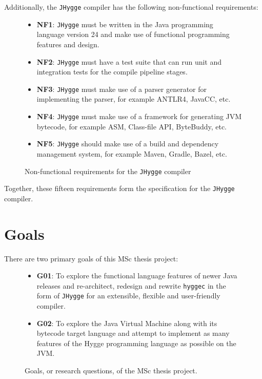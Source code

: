 Additionally, the \texttt{JHygge} compiler has the following non-functional requirements:

\begin{figure}
\centering  
\begin{itemize}
  \item \textbf{NF1}: \texttt{JHygge} must be written in the Java programming language version 24 and make use of functional programming features and design.
  \item \textbf{NF2}: \texttt{JHygge} must have a test suite that can run unit and integration tests for the compile pipeline stages.
  \item \textbf{NF3}: \texttt{JHygge} must make use of a parser generator for implementing the parser, for example ANTLR4, JavaCC, etc.
  \item \textbf{NF4}: \texttt{JHygge} must make use of a framework for generating JVM bytecode, for example ASM, Class-file API, ByteBuddy, etc.
  \item \textbf{NF5}: \texttt{JHygge} should make use of a build and dependency management system, for example Maven, Gradle, Bazel, etc.
\end{itemize}
\caption{Non-functional requirements for the \texttt{JHygge} compiler}
\label{fig:nonfunctional_requirements}
\end{figure}

Together, these fifteen requirements form the specification for the \texttt{JHygge} compiler.

\section{Goals}

There are two primary goals of this MSc thesis project:

\begin{figure}[H]
\centering 
\begin{itemize}
  \item \textbf{G01}: To explore the functional language features of newer Java releases and re-architect, redesign and rewrite \texttt{hyggec} in the form of \texttt{JHygge} for an extensible, flexible and user-friendly compiler.
  \item \textbf{G02}: To explore the Java Virtual Machine along with its bytecode target language and attempt to implement as many features of the Hygge programming language as possible on the JVM.
\end{itemize}
\caption{Goals, or research questions, of the MSc thesis project.}
\label{fig:thesis_goals}
\end{figure}


